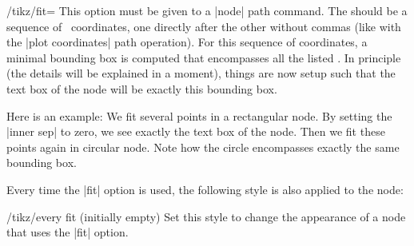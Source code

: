 \begin{key}{/tikz/fit=}
  This option must be given to a |node| path command. The
   should be a sequence of \tikzname\ coordinates,
  one directly after the other without commas (like with the
  |plot coordinates| path operation).  For this sequence of
  coordinates, a minimal bounding box is computed that
  encompasses all the listed . In principle (the
  details will be explained in a moment), things are now setup such
  that the text box of the node will be exactly this bounding box.

  Here is an example: We fit several points in a rectangular node. By
  setting the |inner sep| to zero, we see exactly the text box of the
  node. Then we fit these points again in circular node. Note how
  the circle encompasses exactly the same bounding box.
\begin{codeexample}[]
\end{codeexample}

  Every time the |fit| option is used, the following style is also
  applied to the node:
  \begin{key}{/tikz/every fit (initially \normalfont empty)}
    Set this style to change the appearance of a node that uses the
    |fit| option.
  \end{key}


\end{key}
